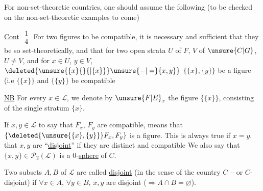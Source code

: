 
For non-set-theoretic countries, one should assume the following (to be checked on the non-set-theoretic examples to come)

\uline{Cont} $\substack{1\\4}$ For two figures  to be \margin{\rule{0.35pt}{4.5\baselineskip}}compatible, it is necessary and sufficient that they be so set-theoretically, and that for two  open strata $U$ of $F$, $V$ of $\unsure{C|G}$, $U\ne V$,  and for  $x\in U$, $y\in V$, $\deleted{\unsure{\{x\}\{\}\{|\{x\}\}}\unsure{-|=}\{x,y\}}$ $\{\{x\},\{y\}\}$ be a figure (i.e $\{\{x\}\}$ and $\{\{y\}\}$ be compatible


\uline{NB} For every $x\in \mathcal L$, we denote by $\unsure{F|E}_x$ the figure $\{\{x\}\}$, consisting of the single stratum $\{x\}$.


 If $x,y\in \mathcal L$ to say that $F_x$, $F_y$ are compatible, means that $\{\deleted{\unsure{\{x\},\{y\}}}F_x,F_y\}$ is  a figure. This is always true if $x=y$.   that \deleted{$\{$} $x,y$ are ``\uline{disjoint}'' if they are distinct and compatible  We also say  that $\{x,y\}\in \mathcal P_2(\mathcal L)$ is a 0-\uline{sphere} of $C$.

Two subsets  $A,B$ of $\mathcal L$ are called \uline{disjoint} (in the sense of the country $C$ -- or $C$-disjoint) if $\forall x\in A$, $\forall y\in B$, $x,y$ are disjoint ($\Longrightarrow A\cap B=\varnothing$).
